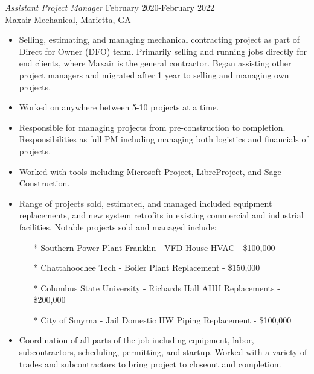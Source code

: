 \documentclass[margin]{res}
\begin{document}
\begin{resume}
    {\sl Assistant Project Manager} \hfill February 2020-February 2022 \\
 	    Maxair Mechanical, Marietta, GA
        \begin{itemize}  \itemsep -2pt %
            \item Selling, estimating, and managing mechanical contracting project as part of Direct for Owner (DFO) team. Primarily selling and running jobs directly for end clients, where Maxair is the general contractor. Began assisting other project managers and migrated after 1 year to selling and managing own projects.
            \item Worked on anywhere between 5-10 projects at a time.
            \item Responsible for managing projects from pre-construction to completion. Responsibilities as full PM including managing both logistics and financials of projects.
            \item Worked with tools including Microsoft Project, LibreProject, and Sage Construction.
            \item Range of projects sold, estimated, and managed included equipment replacements, and new system retrofits in existing commercial and industrial facilities. Notable projects sold and managed include:
              \begin{itemize}
                \item[*] Southern Power Plant Franklin - VFD House HVAC - \$100,000
                \item[*] Chattahoochee Tech - Boiler Plant Replacement - \$150,000
                \item[*] Columbus State University - Richards Hall AHU Replacements - \$200,000
                \item[*] City of Smyrna - Jail Domestic HW Piping Replacement - \$100,000
              \end{itemize}
            \item Coordination of all parts of the job including equipment, labor, subcontractors, scheduling, permitting, and startup. Worked with a variety of trades and subcontractors to bring project to closeout and completion.
            \end{itemize}


\end{resume}
\end{document}
